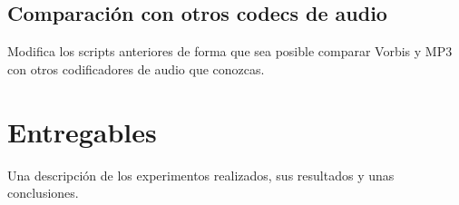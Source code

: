 


\subsection{Comparaci\'on con otros codecs de audio}
Modifica los scripts anteriores de forma que sea posible comparar
Vorbis y MP3 con otros codificadores de audio que conozcas.


\section{Entregables}
Una descripci\'on de los experimentos realizados, sus resultados y
unas conclusiones.

\begin{comment}
\partc*{The Question - La Pregunta}

\begin{itemize}
\item ¿Existe alguna correlación entre la longitud (en tiempo) de la
  secuencia de audio usada en los tests y la diferencia entre los
  rendimientos de Vorbis y MP3? En otras palabras, ¿depende la
  diferencia en la calidad proporcionada por Vorbis y MP3 del tamaño
  de la secuencia de audio?
\end{itemize}

\end{comment}
